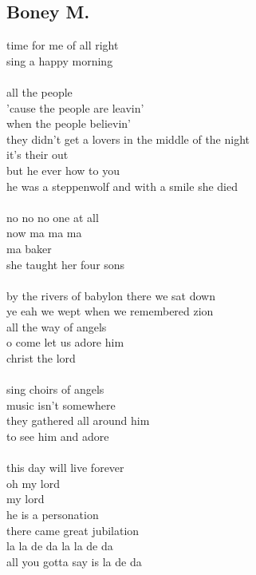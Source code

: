 \documentclass[conference]{IEEEtran}
\begin{document}
\subsection{Boney M.}\label{A1}
time for me of all right \\
sing a happy morning \\
\\
all the people \\
'cause the people are leavin' \\
when the people believin' \\
they didn't get a lovers in the middle of the night \\
it's their out \\
but he ever how to you \\
he was a steppenwolf and with a smile she died \\
\\
no no no one at all \\
now ma ma ma \\
ma baker \\
she taught her four sons \\
\\
by the rivers of babylon there we sat down \\
ye eah we wept when we remembered zion \\
all the way of angels \\
o come let us adore him \\
christ the lord \\
\\
sing choirs of angels \\
music isn't somewhere \\
they gathered all around him \\
to see him and adore \\
\\
this day will live forever \\
oh my lord \\
my lord \\
he is a personation \\
there came great jubilation \\
la la de da la la de da \\
all you gotta say is la de da \\
\end{document}
